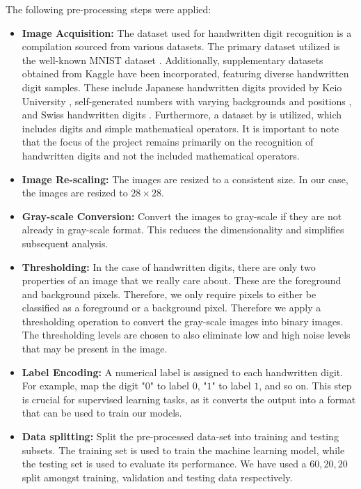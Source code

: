 \documentclass[a4paper,twoside,10pt]{article}
\begin{document}
The following pre-processing steps were applied:
\begin{itemize}
    \item \textbf{Image Acquisition:} The dataset used for handwritten digit recognition is a compilation sourced from various datasets. The primary dataset utilized is the well-known MNIST dataset \cite{deng2012mnist,Colianni2017}. Additionally, supplementary datasets obtained from Kaggle have been incorporated, featuring diverse handwritten digit samples. These include Japanese handwritten digits provided by Keio University \cite{Zalek2019}, self-generated numbers with varying backgrounds and positions \cite{V2022}, and Swiss handwritten digits \cite{Meier2023}. Furthermore, a dataset by \citet{Heusser2020} is utilized, which includes digits and simple mathematical operators. It is important to note that the focus of the project remains primarily on the recognition of handwritten digits and not the included mathematical operators. 
    \item \textbf{Image Re-scaling:} The images are resized to a consistent size. In our case, the images are resized to $28 \times 28$.
    
    \item \textbf{Gray-scale Conversion:} Convert the images to gray-scale if they are not already in gray-scale format. This reduces the dimensionality and simplifies subsequent analysis.
    
    \item \textbf{Thresholding:} In the case of handwritten digits, there are only two properties of an image that we really care about. These are the foreground and background pixels. Therefore, we only require pixels to either be classified as a foreground or a background pixel. Therefore we apply a thresholding operation to convert the gray-scale images into binary images. The thresholding levels are chosen to also eliminate low and high noise levels that may be present in the image.

    \item \textbf{Label Encoding:} A numerical label is assigned to each handwritten digit. For example, map the digit "$0$" to label $0$, "$1$" to label $1$, and so on. This step is crucial for supervised learning tasks, as it converts the output into a format that can be used to train our models.
    
    \item \textbf{Data splitting:} Split the pre-processed data-set into training and testing subsets. The training set is used to train the machine learning model, while the testing set is used to evaluate its performance. We have used a $60, 20, 20$ split amongst training, validation and testing data respectively. 
\end{itemize}
\end{document}
